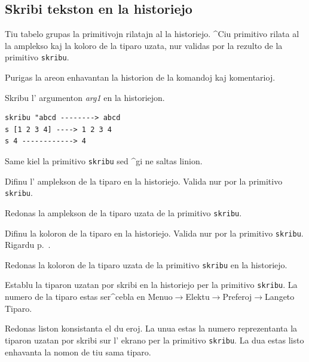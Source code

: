 \subsection{Skribi tekston en la historiejo}

Tiu tabelo grupas la primitivojn rilatajn al la historiejo.
^Ciu primitivo rilata al la amplekso kaj la koloro de la tiparo uzata,
nur validas por la rezulto de la primitivo \texttt{skribu}.


Purigas la areon enhavantan la historion de la komandoj kaj komentarioj.


Skribu l' argumenton \textit{arg1} en la historiejon.

\begin{verbatim}
skribu "abcd --------> abcd
s [1 2 3 4] ----> 1 2 3 4
s 4 ------------> 4
\end{verbatim}


Same kiel la primitivo \texttt{skribu} sed ^gi ne saltas linion.


Difinu l' amplekson de la tiparo en la historiejo.  Valida nur por la
primitivo \texttt{skribu}.


Redonas la amplekson de la tiparo uzata de la primitivo \texttt{skribu}.


Difinu la koloron de la tiparo en la historiejo.  Valida nur por la 
primitivo \texttt{skribu}.  Rigardu p.~\pageref{couleurs}.


Redonas la koloron de la tiparo uzata de la primitivo \texttt{skribu}
en la historiejo.


Establu la tiparon uzatan por skribi en la historiejo per la primitivo
\texttt{skribu}.  La numero de la tiparo estas ser^cebla en 
Menuo$\to$Elektu$\to$Preferoj$\to$Langeto Tiparo.


Redonas liston konsistanta el du eroj.  La unua estas la numero
reprezentanta la tiparon uzatan por skribi sur l' ekrano per la
primitivo \texttt{skribu}.  La dua estas listo enhavanta la nomon de
tiu sama tiparo.

